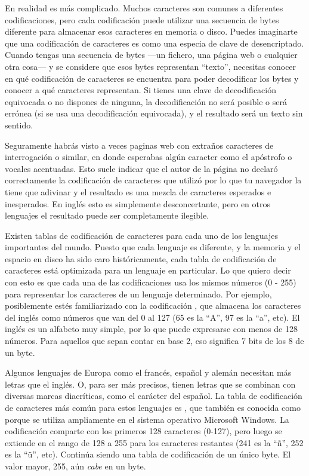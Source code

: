 En realidad es más complicado. Muchos caracteres son comunes a diferentes codificaciones, pero cada codificación puede utilizar una secuencia de bytes diferente para almacenar esos caracteres en memoria o disco. Puedes imaginarte que una codificación de caracteres es como una especia de clave de desencriptado. Cuando tengas una secuencia de bytes ---un fichero, una página web o cualquier otra cosa--- y se considere que esos bytes representan ``texto'', necesitas conocer en qué codificación de caracteres se encuentra para poder decodificar los bytes y conocer a qué caracteres representan. Si tienes una clave de decodificación equivocada o no dispones de ninguna, la decodificación no será posible o será errónea (si se usa una decodificación equivocada), y el resultado será un texto sin sentido.


Seguramente  habrás visto a veces paginas web con extraños caracteres de interrogación o similar, en donde esperabas algún caracter como el apóstrofo o vocales acentuadas. Esto suele indicar que el autor de la página no declaró correctamente la codificación de caracteres que utilizó por lo que tu navegador la tiene que adivinar y el resultado es una mezcla de caracteres esperados e inesperados. En inglés esto es simplemente desconcertante, pero en otros lenguajes el resultado puede ser completamente ilegible.

Existen tablas de codificación de caracteres para cada uno de los lenguajes importantes del mundo. Puesto que cada lenguaje es diferente, y la memoria y el espacio en disco ha sido caro históricamente, cada tabla de codificación de caracteres está optimizada para un lenguaje en particular. Lo que quiero decir con esto es que cada una de las codificaciones usa los mismos números (0 - 255) para representar los caracteres de un lenguaje determinado. Por ejemplo, posiblemente estés familiarizado con la codificación , que almacena los caracteres del inglés como números que van del 0 al 127 (65 es la ``A'', 97 es la ``a'', etc). El inglés es un alfabeto muy simple, por lo que puede expresarse con menos de 128 números. Para aquellos que sepan contar en base 2, eso significa 7 bits de los 8 de un byte.

Algunos lenguajes de Europa como el francés, español y alemán necesitan más letras que el inglés. O, para ser más precisos, tienen letras que se combinan con diversas marcas diacríticas, como el carácter  del español. La tabla de codificación de caracteres más común para estos lenguajes es , que también es conocida como  porque se utiliza ampliamente en el sistema operativo Microsoft Windows. La codificación  comparte con  los primeros 128 caracteres (0-127), pero luego se extiende en el rango de 128 a 255 para los caracteres restantes (241 es la ``ñ'', 252 es la ``ü'', etc). Continúa siendo una tabla de codificación de un único byte. El valor mayor, 255, aún \emph{cabe} en un byte.


